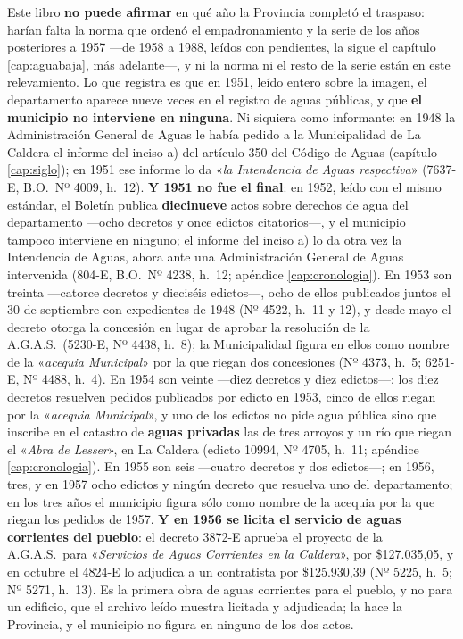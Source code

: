 Este libro \textbf{no puede afirmar} en qué año la Provincia completó el
traspaso: harían falta la norma que ordenó el empadronamiento y la serie de los años
posteriores a 1957 ---de 1958 a 1988, leídos con pendientes, la sigue el capítulo \ref{cap:aguabaja}, más adelante---, y ni la norma ni el resto de la serie están en este relevamiento. Lo que registra es que en
1951, leído entero sobre la imagen, el departamento aparece nueve veces en el registro de
aguas públicas, y que \textbf{el municipio no interviene en ninguna}. Ni siquiera como informante:
en 1948 la Administración General de Aguas le había pedido a la Municipalidad de La Caldera el
informe del inciso a) del artículo 350 del Código de Aguas (capítulo \ref{cap:siglo}); en 1951
ese informe lo da «\textit{la Intendencia de Aguas respectiva}» (7637-E, B.O.\ Nº 4009, h.\ 12). \textbf{Y 1951 no fue el final}: en 1952, leído con el mismo estándar, el Boletín publica \textbf{diecinueve} actos sobre derechos de agua del departamento ---ocho decretos y once edictos citatorios---, y el municipio tampoco interviene en ninguno; el informe del inciso a) lo da otra vez la Intendencia de Aguas, ahora ante una Administración General de Aguas intervenida (804-E, B.O.\ Nº 4238, h.\ 12; apéndice \ref{cap:cronologia}). En 1953 son treinta ---catorce decretos y dieciséis edictos---, ocho de ellos publicados juntos el 30 de septiembre con expedientes de 1948 (Nº 4522, h.\ 11 y 12), y desde mayo el decreto otorga la concesión en lugar de aprobar la resolución de la A.G.A.S.\ (5230-E, Nº 4438, h.\ 8); la Municipalidad figura en ellos como nombre de la «\textit{acequia Municipal}» por la que riegan dos concesiones (Nº 4373, h.\ 5; 6251-E, Nº 4488, h.\ 4). En 1954 son veinte ---diez decretos y diez edictos---: los diez decretos resuelven pedidos publicados por edicto en 1953, cinco de ellos riegan por la «\textit{acequia Municipal}», y uno de los edictos no pide agua pública sino que inscribe en el catastro de \textbf{aguas privadas} las de tres arroyos y un río que riegan el «\textit{Abra de Lesser}», en La Caldera (edicto 10994, Nº 4705, h.\ 11; apéndice \ref{cap:cronologia}). En 1955 son seis ---cuatro decretos y dos edictos---; en 1956, tres, y en 1957 ocho edictos y ningún decreto que resuelva uno del departamento; en los tres años el municipio figura sólo como nombre de la acequia por la que riegan los pedidos de 1957. \textbf{Y en 1956 se licita el servicio de aguas corrientes del pueblo}: el decreto 3872-E aprueba el proyecto de la A.G.A.S.\ para «\textit{Servicios de Aguas Corrientes en la Caldera}», por \$127.035,05, y en octubre el 4824-E lo adjudica a un contratista por \$125.930,39 (Nº 5225, h.\ 5; Nº 5271, h.\ 13). Es la primera obra de aguas corrientes para el pueblo, y no para un edificio, que el archivo leído muestra licitada y adjudicada; la hace la Provincia, y el municipio no figura en ninguno de los dos actos.

